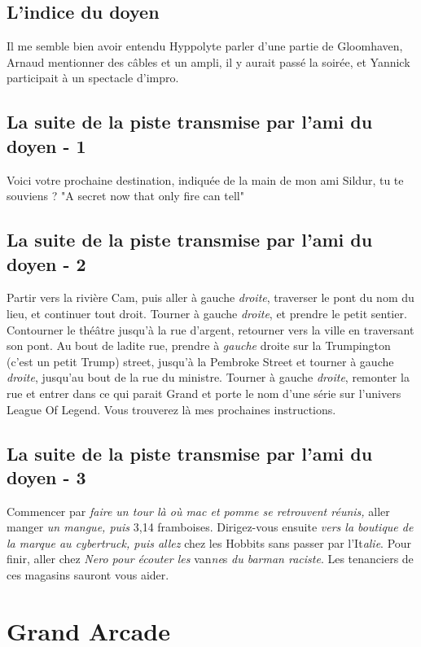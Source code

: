 \documentclass[12pt]{article}
\begin{document}
\subsection{L'indice du doyen}

Il me semble bien avoir entendu Hyppolyte parler d'une partie de Gloomhaven, Arnaud mentionner des câbles et un ampli, il y aurait passé la soirée, et Yannick participait à un spectacle d'impro.

\subsection{La suite de la piste transmise par l'ami du doyen - 1}

Voici votre prochaine destination, indiquée de la main de mon ami Sildur, tu te souviens ? "A secret now that only fire can tell"


\subsection{La suite de la piste transmise par l'ami du doyen - 2}

Partir vers la rivière Cam, puis aller à gauche {\it droite}, traverser le pont du nom du lieu, et continuer tout droit.
Tourner à gauche {\it droite}, et prendre le petit sentier.
Contourner le théâtre jusqu'à la rue d'argent, retourner vers la ville en traversant son pont. Au bout de ladite rue, prendre à {\it gauche} droite sur la Trumpington (c'est un petit Trump) street, jusqu'à la Pembroke Street et tourner à gauche {\it droite}, jusqu'au bout de la rue du ministre. Tourner à gauche {\it droite}, remonter la rue et entrer dans ce qui parait Grand et porte le nom d'une série sur l'univers League Of Legend. Vous trouverez là mes prochaines instructions.

\subsection{La suite de la piste transmise par l'ami du doyen - 3}

Commencer par {\it faire un tour là où mac et pomme se retrouvent réunis,} aller manger {\it un mangue, puis} 3,14 framboises. Dirigez-vous ensuite {\it vers la boutique de la marque au cybertruck, puis allez} chez les Hobbits sans passer par l'It{\it alie}. Pour finir, aller chez {\it Nero pour écouter les} van{\it ne}s {\it du barman raciste}. Les tenanciers de ces magasins sauront vous aider.


\section{Grand Arcade}
\end{document}
